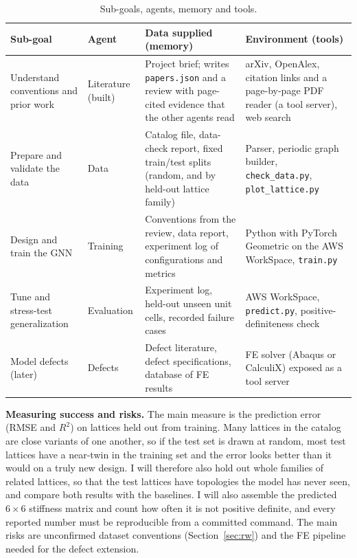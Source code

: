 \documentclass[11pt]{article}
\begin{document}
\begin{table}[h]\centering\small
\caption{Sub-goals, agents, memory and tools.}\label{tab:agents}
\begin{tabularx}{\linewidth}{@{}>{\raggedright\arraybackslash}p{2.9cm} >{\raggedright\arraybackslash}p{2.0cm} Y Y@{}}
\toprule
Sub-goal & Agent & Data supplied (memory) & Environment (tools) \\
\midrule
Understand conventions and prior work & Literature (built) & Project brief; writes \texttt{papers.json} and a review with page-cited evidence that the other agents read & arXiv, OpenAlex, citation links and a page-by-page PDF reader (a tool server), web search \\
Prepare and validate the data & Data & Catalog file, data-check report, fixed train/test splits (random, and by held-out lattice family) & Parser, periodic graph builder, \texttt{check\_data.py}, \texttt{plot\_lattice.py} \\
Design and train the GNN & Training & Conventions from the review, data report, experiment log of configurations and metrics & Python with PyTorch Geometric on the AWS WorkSpace, \texttt{train.py} \\
Tune and stress-test generalization & Evaluation & Experiment log, held-out unseen unit cells, recorded failure cases & AWS WorkSpace, \texttt{predict.py}, positive-definiteness check \\
Model defects (later) & Defects & Defect literature, defect specifications, database of FE results & FE solver (Abaqus or CalculiX) exposed as a tool server \\
\bottomrule
\end{tabularx}
\end{table}

\textbf{Measuring success and risks.} The main measure is the prediction error (RMSE and $R^2$) on
lattices held out from training. Many lattices in the catalog are close variants of one another,
so if the test set is drawn at random, most test lattices have a near-twin in the training set and
the error looks better than it would on a truly new design. I will therefore also hold out whole
families of related lattices, so that the test lattices have topologies the model has never seen,
and compare both results with the baselines. I will also assemble the predicted $6\times6$
stiffness matrix and count how often it is not positive definite, and every reported number must be
reproducible from a committed command. The main risks are unconfirmed dataset conventions
(Section~\ref{sec:rw}) and the FE pipeline needed for the defect extension.
\end{document}
